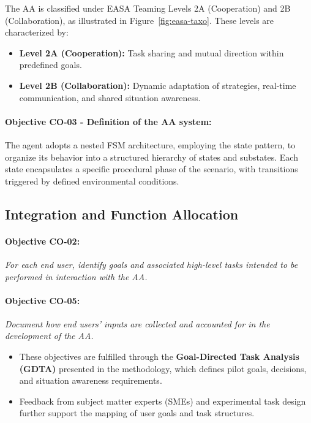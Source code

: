 \documentclass[12pt,a4paper]{article} %
\begin{document}
	The AA is classified under EASA Teaming Levels 2A (Cooperation) and 2B (Collaboration), as illustrated in Figure~\ref{fig:easa-taxo}. These levels are characterized by:
	
	\begin{itemize}
	  \item \textbf{Level 2A (Cooperation):} Task sharing and mutual direction within predefined goals.
	  \item \textbf{Level 2B (Collaboration):} Dynamic adaptation of strategies, real-time communication, and shared situation awareness.
	\end{itemize}

	\paragraph{Objective CO-03 - Definition of the AA system:} The agent adopts a nested FSM architecture, employing the state pattern, to organize its behavior into a structured hierarchy of states and substates. Each state encapsulates a specific procedural phase of the scenario, with transitions triggered by defined environmental conditions.
	
	\subsection*{Integration and Function Allocation}
	
	\paragraph{Objective CO-02:} \textit{For each end user, identify goals and associated high-level tasks intended to be performed in interaction with the AA.}
	
	\paragraph{Objective CO-05:} \textit{Document how end users' inputs are collected and accounted for in the development of the AA.}
	
	\begin{itemize}
	  \item These objectives are fulfilled through the \textbf{Goal-Directed Task Analysis (GDTA)} presented in the methodology, which defines pilot goals, decisions, and situation awareness requirements. 
	  \item Feedback from subject matter experts (SMEs) and experimental task design further support the mapping of user goals and task structures.
	\end{itemize}
	
\end{document}
